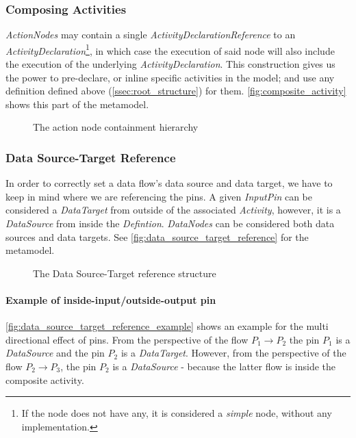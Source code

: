\subsubsection*{Composing Activities}\label{ssec:composing-activities}

\emph{ActionNodes} may contain a single \emph{ActivityDeclarationReference} to an \emph{ActivityDeclaration}\footnote{If the node does not have any, it is considered a \emph{simple} node, without any implementation.}, in which case the execution of said node will also include the execution of the underlying \emph{ActivityDeclaration}. This construction gives us the power to pre-declare, or inline specific activities in the model; and use any definition defined above (\autoref{ssec:root_structure})  for them. \autoref{fig:composite_activity} shows this part of the metamodel.

\begin{figure}[!ht]
	\centering
	
	\caption{The action node containment hierarchy}
	\label{fig:composite_activity}
\end{figure}

\subsubsection*{Data Source-Target Reference}\label{ssec:data-reference}

In order to correctly set a data flow's data source and data target, we have to keep in mind where we are referencing the pins. A given \emph{InputPin} can be considered a \emph{DataTarget} from outside of the associated \emph{Activity}, however, it is a \emph{DataSource} from inside the \emph{Defintion}. \emph{DataNodes} can be considered both data sources and data targets. See \autoref{fig:data_source_target_reference} for the metamodel.

\begin{figure}[!ht]
	\centering
	
	\caption{The Data Source-Target reference structure}
	\label{fig:data_source_target_reference}
\end{figure}

\paragraph{Example of inside-input/outside-output pin} \autoref{fig:data_source_target_reference_example} shows an example for the multi directional effect of pins. From the perspective of the flow \(P_1 \rightarrow P_2\) the pin \(P_1\) is a \emph{DataSource} and the pin \(P_2\) is a \emph{DataTarget}. However, from the perspective of the flow \(P_2 \rightarrow P_3\), the pin \(P_2\) is a \emph{DataSource} - because the latter flow is inside the composite activity.

